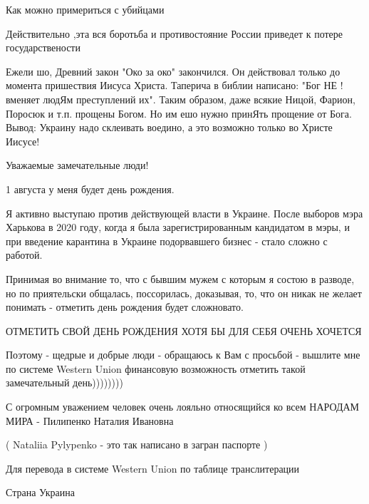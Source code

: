 Как можно примериться с убийцами

 
Действительно ,эта вся боротьба и противостояние России приведет к потере государствености


Ежели шо, Древний закон "Око за око" закончился. Он действовал только до
момента пришествия Иисуса Христа. Таперича в библии написано: "Бог НЕ ! вменяет
людЯм преступлений их". Таким образом, даже всякие Ницой, Фарион, Поросюк и
т.п. прощены Богом. Но им ешо нужно принЯть прощение от Бога. Вывод: Украину
надо склеивать воедино, а это возможно только во Христе Иисусе!


Уважаемые замечательные люди!

1 августа у меня будет день рождения.

Я активно выступаю против действующей власти в Украине. После выборов мэра
Харькова в 2020 году, когда я была зарегистрированным кандидатом в мэры, и при
введение карантина в Украине подорвавшего бизнес - стало сложно с работой.

Принимая во внимание то, что с бывшим мужем с которым я состою в разводе, но по
приятельски общалась, поссорилась, доказывая, то, что он никак не желает
понимать - отметить день рождения будет сложновато.

ОТМЕТИТЬ СВОЙ ДЕНЬ РОЖДЕНИЯ ХОТЯ БЫ ДЛЯ СЕБЯ ОЧЕНЬ ХОЧЕТСЯ

Поэтому - щедрые и добрые люди - обращаюсь к Вам с просьбой - вышлите мне по
системе Western Union финансовую возможность отметить такой замечательный
день))))))))

С огромным уважением человек очень лояльно относящийся ко всем НАРОДАМ МИРА -
Пилипенко Наталия Ивановна

( Nataliia Pylypenko - это так написано в загран паспорте )

Для перевода в системе Western Union по таблице транслитерации

Страна Украина


